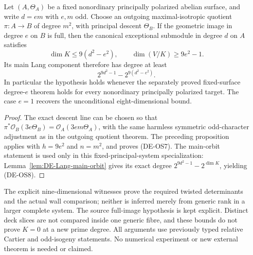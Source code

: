 \begin{corollary}
\label{cor:DE-known-odd-divisor-quotient-bound}
Let \((A,\Theta_A)\) be a fixed nonordinary principally polarized
abelian surface, and write \(d=em\) with \(e,m\) odd. Choose an
outgoing maximal-isotropic quotient \(\pi:A\to B\) of degree
\(m^2\), with principal descent \(\Theta_B\).
If the geometric image in degree \(e\) on \(B\) is full, then the
canonical exceptional submodule in degree \(d\) on \(A\) satisfies
\[
 \dim K\leq 9(d^2-e^2),\qquad
 \dim(V/K)\geq9e^2-1.
 \tag{DE-OS7}
\]
Its main Lang component therefore has degree at least
\[
                   2^{9d^2-1}-2^{9(d^2-e^2)}.
 \tag{DE-OS8}
\]
In particular the hypothesis holds whenever the separately proved
fixed-surface degree-\(e\) theorem holds for every nonordinary
principally polarized target. The case \(e=1\) recovers the
unconditional eight-dimensional bound.
\end{corollary}
\begin{proof}
The exact descent line can be chosen so that
\(\pi^*\mathcal O_B(3e\Theta_B)
  =\mathcal O_A(3em\Theta_A)\), with the same harmless symmetric
odd-character adjustment as in the outgoing quotient theorem.
The preceding proposition applies with \(h=9e^2\) and \(n=m^2\),
and proves (DE-OS7). The main-orbit statement is used only in this
fixed-principal-system specialization: Lemma~\ref{lem:DE-Lang-main-orbit}
gives its exact degree \(2^{9d^2-1}-2^{\dim K}\), yielding (DE-OS8).
\end{proof}

\begin{remark}
\label{rem:DE-odd-source-restriction-scope}
The explicit nine-dimensional witnesses prove the required twisted
determinants and the actual wall comparison; neither is inferred
merely from generic rank in a larger complete system. The source
full-image hypothesis is kept explicit. Distinct deck slices are not
compared inside one generic fibre, and these bounds do not prove
\(K=0\) at a new prime degree. All arguments use previously typed
relative Cartier and odd-isogeny statements. No numerical experiment
or new external theorem is needed or claimed.
\end{remark}
